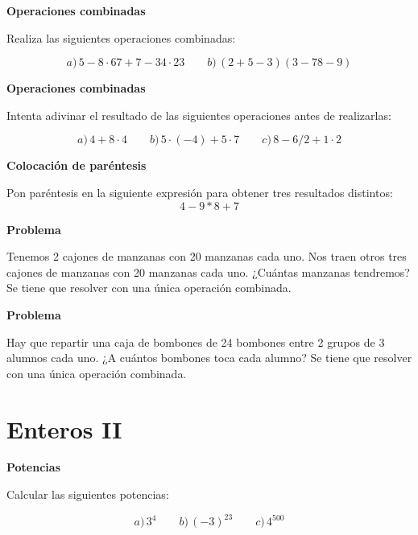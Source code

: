\documentclass[a4paper, 11pt]{scrartcl}
\begin{document}
\noindent\textbf{\sffamily Operaciones combinadas}

Realiza las siguientes operaciones combinadas:

$$
a)\, 5 - 8\cdot 67 + 7 - 34 \cdot 23\qquad b)\, (2+5-3)(3-78-9)
$$





\noindent\textbf{\sffamily Operaciones combinadas}

Intenta adivinar el resultado de las siguientes operaciones antes de realizarlas:

$$
a)\,4 +8 \cdot 4 \qquad b)\, 5\cdot (-4) + 5\cdot 7\qquad c)\, 8-6/2 + 1\cdot 2
$$





\noindent\textbf{\sffamily Colocación de paréntesis}

Pon paréntesis en la siguiente expresión para obtener tres resultados distintos:
$$
4 - 9 * 8 +7
$$





\noindent\textbf{\sffamily Problema}

Tenemos 2 cajones de manzanas con 20 manzanas cada uno. Nos traen otros tres cajones de manzanas con 20 manzanas cada uno. ¿Cuántas manzanas tendremos? Se tiene que resolver con una única operación combinada.





\noindent\textbf{\sffamily Problema}

Hay que repartir una caja de bombones de 24 bombones entre 2 grupos de 3 alumnos cada uno. ¿A cuántos bombones toca cada alumno? Se tiene que resolver con una única operación combinada.





\newpage

\section{Enteros II}






\noindent\textbf{\sffamily Potencias}

Calcular las siguientes potencias:

$$
a)\, 3^4 \qquad b)\, (-3)^{23} \qquad c)\, 4^{500}
$$
\end{document}
